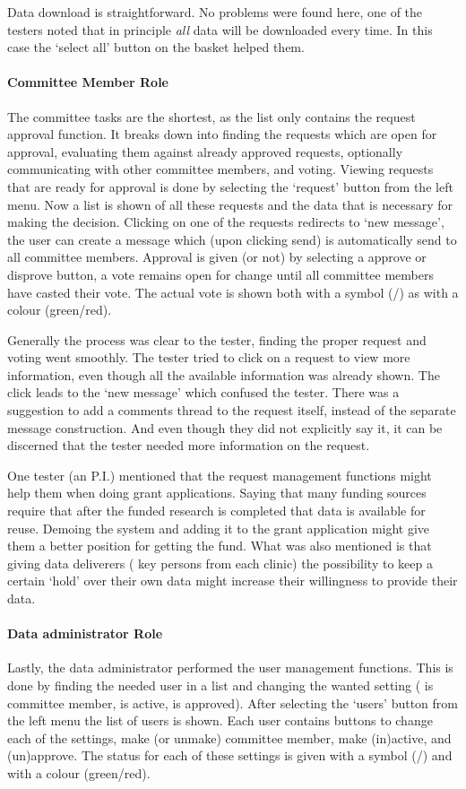 Data download is straightforward. 
No problems were found here, one of the testers noted that in principle \emph{all} data will be downloaded every time.
In this case the `select all' button on the basket helped them.

\paragraph{Committee Member Role}
The committee tasks are the shortest, as the list only contains the request approval function. 
It breaks down into finding the requests which are open for approval, evaluating them against already approved requests, optionally communicating with other committee members, and voting.
Viewing requests that are ready for approval is done by selecting the `request' button from the left menu.
Now a list is shown of all these requests and the data that is necessary for making the decision.
Clicking on one of the requests redirects to `new message', the user can create a message which (upon clicking send) is automatically send to all committee members.
Approval is given (or not) by selecting a approve or disprove button, a vote remains open for change until all committee members have casted their vote.
The actual vote is shown both with a symbol (\checkmark{}/\texttimes{}) as with a colour (green/red).

Generally the process was clear to the tester, finding the proper request and voting went smoothly.
The tester tried to click on a request to view more information, even though all the available information was already shown.
The click leads to the `new message' which confused the tester.
There was a suggestion to add a comments thread to the request itself, instead of the separate message construction.
And even though they did not explicitly say it, it can be discerned that the tester needed more information on the request.

One tester (an P.I.) mentioned that the request management functions might help them when doing grant applications.
Saying that many funding sources require that after the funded research is completed that data is available for reuse.
Demoing the system and adding it to the grant application might give them a better position for getting the fund.
What was also mentioned is that giving data deliverers (\ie{} key persons from each clinic) the possibility to keep a certain `hold' over their own data might increase their willingness to provide their data.

\paragraph{Data administrator Role}
Lastly, the data administrator performed the user management functions.
This is done by finding the needed user in a list and changing the wanted setting (\ie{} is committee member, is active, is approved).
After selecting the `users' button from the left menu the list of users is shown. 
Each user contains buttons to change each of the settings, \ie{} make (or unmake) committee member, make (in)active, and (un)approve.
The status for each of these settings is given with a symbol (\checkmark{}/\texttimes{}) and with a colour (green/red).

